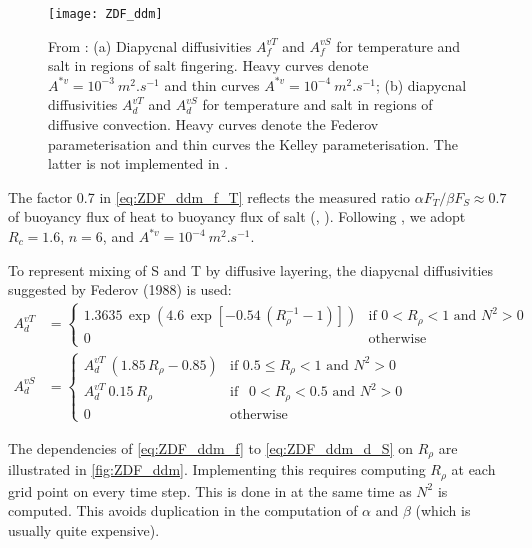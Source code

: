 \documentclass[../main/NEMO_manual]{subfiles}
\begin{document}
\begin{figure}[!t]
  \centering
  \texttt{[image: ZDF\_ddm]}
  \caption[Diapycnal diffusivities for temperature and salt in regions of salt fingering and
  diffusive convection]{
    From \citet{merryfield.holloway.ea_JPO99}:
    (a) Diapycnal diffusivities $A_f^{vT}$ and $A_f^{vS}$ for temperature and salt in
    regions of salt fingering.
    Heavy curves denote $A^{\ast v} = 10^{-3}~m^2.s^{-1}$ and
    thin curves $A^{\ast v} = 10^{-4}~m^2.s^{-1}$;
    (b) diapycnal diffusivities $A_d^{vT}$ and $A_d^{vS}$ for temperature and salt in
    regions of diffusive convection.
    Heavy curves denote the Federov parameterisation and thin curves the Kelley parameterisation.
    The latter is not implemented in \NEMO.}
  \label{fig:ZDF_ddm}
\end{figure}

The factor 0.7 in \autoref{eq:ZDF_ddm_f_T} reflects the measured ratio $\alpha F_T /\beta F_S \approx  0.7$ of
buoyancy flux of heat to buoyancy flux of salt (\eg, \citet{mcdougall.taylor_JMR84}).
Following  \citet{merryfield.holloway.ea_JPO99}, we adopt $R_c = 1.6$, $n = 6$, and $A^{\ast v} = 10^{-4}~m^2.s^{-1}$.

To represent mixing of S and T by diffusive layering,  the diapycnal diffusivities suggested by
Federov (1988) is used:
\begin{align}
  A_d^{vT} &=
             \begin{cases}
               1.3635 \, \exp{\left( 4.6\, \exp{ \left[  -0.54\,( R_{\rho}^{-1} - 1 )  \right] }    \right)}
               &\text{if  $0<R_\rho < 1$ and $N^2>0$ } \\
               0 								&\text{otherwise}
             \end{cases}
                                       \nonumber \\
  \label{eq:ZDF_ddm_d_S}
  A_d^{vS} &=
             \begin{cases}
               A_d^{vT}\ \left( 1.85\,R_{\rho} - 0.85 \right) &\text{if  $0.5 \leq R_\rho<1$ and $N^2>0$ } \\
               A_d^{vT} \ 0.15 \ R_\rho               &\text{if  $\ \ 0 < R_\rho<0.5$ and $N^2>0$ } \\
               0 								&\text{otherwise}
             \end{cases}
\end{align}

The dependencies of \autoref{eq:ZDF_ddm_f} to \autoref{eq:ZDF_ddm_d_S} on $R_\rho$ are illustrated in
\autoref{fig:ZDF_ddm}.
Implementing this requires computing $R_\rho$ at each grid point on every time step.
This is done in  at the same time as $N^2$ is computed.
This avoids duplication in the computation of $\alpha$ and $\beta$ (which is usually quite expensive).
\end{document}
